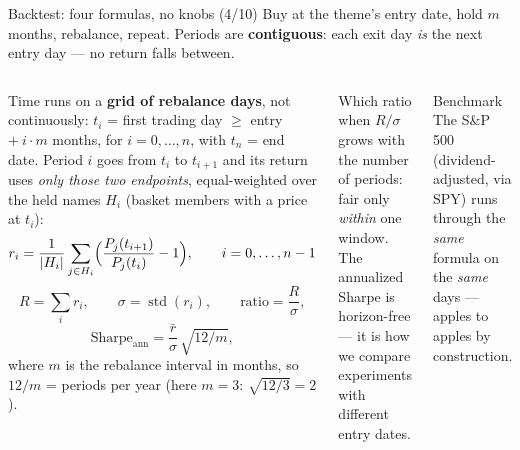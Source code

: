 \documentclass[10pt,aspectratio=169]{beamer}
\begin{document}
\begin{frame}[t]{Backtest: four formulas, no knobs (4/10)}
  \footnotesize
  Buy at the theme's entry date, hold $m$ months, rebalance, repeat. Periods are
  \textbf{contiguous}: each exit day \emph{is} the next entry day --- no return falls between.

  \begin{columns}[T,onlytextwidth]
    Time runs on a \textbf{grid of rebalance days}, not continuously: $t_i$ = first trading
    day $\ge$ entry $+\ i\cdot m$ months, for $i = 0,\dots,n$, with $t_n$ = end date.
    Period $i$ goes from $t_i$ to $t_{i+1}$ and its return uses \emph{only those two
    endpoints}, equal-weighted over the held names $H_i$ (basket members with a price at $t_i$):
    \[
      r_i = \frac{1}{|H_i|} \sum_{j \in H_i} \Bigl( \frac{P_j(t_{i+1})}{P_j(t_i)} - 1 \Bigr),
      \qquad i = 0,\dots,n-1
    \]
    \[
      R = \sum_i r_i, \qquad \sigma = \operatorname{std}(r_i), \qquad
      \text{ratio} = \frac{R}{\sigma},
    \]
    \[
      \text{Sharpe}_{\text{ann}} = \frac{\bar r}{\sigma}\,\sqrt{12/m},
    \]
    where $m$ is the rebalance interval in months, so $12/m$ = periods per year
    (here $m=3$: $\sqrt{12/3}=2$).
      \begin{block}{Which ratio when}
        \scriptsize
        $R/\sigma$ grows with the number of periods: fair only \emph{within} one window.
        The annualized Sharpe is horizon-free --- it is how we compare experiments with
        different entry dates.
      \end{block}
      \begin{block}{Benchmark}
        \scriptsize
        The S\&P\,500 (dividend-adjusted, via SPY) runs through the \emph{same} formula on
        the \emph{same} days --- apples to apples by construction.
      \end{block}
  \end{columns}
\end{frame}
\end{document}
